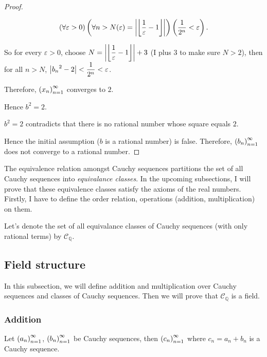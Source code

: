 \begin{proof}
\begin{enumerate}[label={\textbf{Step \arabic*.}},start=4,itemindent=1cm]
              \[
                  (\forall\varepsilon > 0)\left(\forall n > N(\varepsilon) = \left\vert{\left\lfloor{\frac{1}{\varepsilon} - 1}\right\rfloor}\right\vert\right)\left( \frac{1}{2^{n}} < \varepsilon \right).
              \]

              So for every $\varepsilon > 0$, choose $N = \left\vert{\left\lfloor{\dfrac{1}{\varepsilon} - 1}\right\rfloor}\right\vert + 3$ (I plus 3 to make sure $N > 2$), then for all $n > N$, $\left\vert{{b_{n}}^{2} - 2}\right\vert < \dfrac{1}{2^{n}} < \varepsilon$.

              Therefore, ${\left({x_{n}}\right)}^{\infty}_{n=1}$ converges to $2$.

              Hence $b^{2} = 2$.
    \end{enumerate}

    $b^{2} = 2$ contradicts that there is no rational number whose square equals $2$.

    Hence the initial assumption ($b$ is a rational number) is false. Therefore, ${\left({b_{n}}\right)}^{\infty}_{n=1}$ does not converge to a rational number.
\end{proof}

The equivalence relation amongst Cauchy sequences partitions the set of all Cauchy sequences into \textit{equivalance classes}. In the upcoming subsections, I will prove that these equivalence classes satisfy the axioms of the real numbers. Firstly, I have to define the order relation, operations (addition, multiplication) on them.

Let's denote the set of all equivalance classes of Cauchy sequences (with only rational terms) by $\mathscr{C}_{\mathbb{Q}}$.

\subsection{Field structure}

In this subsection, we will define addition and multiplication over Cauchy sequences and classes of Cauchy sequences. Then we will prove that $\mathscr{C}_{\mathbb{Q}}$ is a field.

\subsubsection*{Addition}

\begin{theorem}\label{theorem:chapter1:sum-of-cauchy-sequences}
    Let ${\left({a_{n}}\right)}^{\infty}_{n=1}$, ${\left({b_{n}}\right)}^{\infty}_{n=1}$ be Cauchy sequences, then ${\left({c_{n}}\right)}^{\infty}_{n=1}$ where $c_{n} = a_{n} + b_{n}$ is a Cauchy sequence.
\end{theorem}

